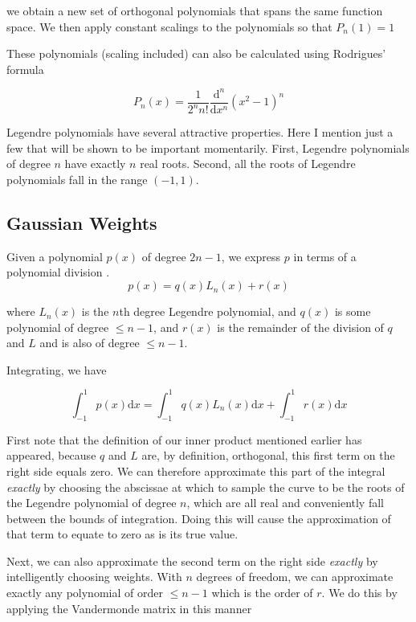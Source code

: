 we obtain a new set of orthogonal polynomials that spans the same function space. We then apply constant scalings to the polynomials so that \(P_n(1) = 1\)

These polynomials (scaling included) can also be calculated using Rodrigues' formula

\[  P_n(x) = \frac{1}{2^n n!} \frac{\mathrm{d}^n}{\mathrm{d}x^n} \left(x^2 - 1 \right) ^n  \]

Legendre polynomials have several attractive properties. Here I mention just a few that will be shown to be important momentarily.  First, Legendre polynomials of degree $n$ have exactly $n$ real roots. Second, all the roots of Legendre polynomials fall in the range $(-1,1)$.

\subsection{Gaussian Weights}

Given a polynomial $p(x)$ of degree $2n-1$, we express $p$ in terms of a polynomial division
.
\[ p(x) = q(x) L_n(x) + r(x) \]

where $L_n(x)$ is the $n$th degree Legendre polynomial, and $q(x)$ is some polynomial of degree $\leq n-1$, and $r(x)$ is the remainder of the division of $q$ and $L$ and is also of degree $\leq n-1$.

Integrating, we have

\[ \int_{-1}^{1} p(x) \mathrm{d}x = \int_{-1}^{1} q(x) L_n(x) \mathrm{d}x + \int_{-1}^{1} r(x) \mathrm{d}x \]

First note that the definition of our inner product mentioned earlier has appeared, because $q$ and $L$ are, by definition, orthogonal, this first term on the right side equals zero.  We can therefore approximate this part of the integral \textit{exactly} by choosing the abscissae at which to sample the curve to be the roots of the Legendre polynomial of degree $n$, which are all real and conveniently fall between the bounds of integration.  Doing this will cause the approximation of that term to equate to zero as is its true value.

Next, we can also approximate the second term on the right side \textit{exactly} by intelligently choosing weights.  With $n$ degrees of freedom, we can approximate exactly any polynomial of order $\leq n-1$ which is the order of $r$.  We do this by applying the Vandermonde matrix in this manner

